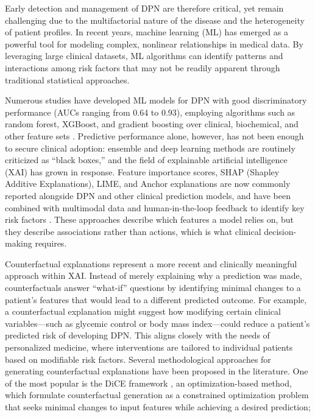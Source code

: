 \documentclass[pdflatex,sn-mathphys-num]{sn-jnl}%
\theoremstyle{thmstyleone}%
\theoremstyle{thmstyletwo}%
\theoremstyle{thmstylethree}%
\begin{document}
Early detection and management of DPN are therefore critical, yet remain challenging due to the multifactorial nature of the disease and the heterogeneity of patient profiles. In recent years, machine learning (ML) has emerged as a powerful tool for modeling complex, nonlinear relationships in medical data. By leveraging large clinical datasets, ML algorithms can identify patterns and interactions among risk factors that may not be readily apparent through traditional statistical approaches. 

Numerous studies have developed ML models for DPN with good discriminatory performance (AUCs ranging from 0.64 to 0.93), employing algorithms such as random forest, XGBoost, and gradient boosting over clinical, biochemical, and other feature sets \cite{ma2025machine,jiang2024multifeature,cui2023study,lian2023Study,Wei2024construction}. Predictive performance alone, however, has not been enough to secure clinical adoption: ensemble and deep learning methods are routinely criticized as ``black boxes,'' and the field of explainable artificial intelligence (XAI) has grown in response. Feature importance scores, SHAP (Shapley Additive Explanations), LIME, and Anchor explanations are now commonly reported alongside DPN and other clinical prediction models, and have been combined with multimodal data and human-in-the-loop feedback to identify key risk factors \cite{wu2025prognostic,jiang2024multifeature,pandey2024decoding,wu2024interpretable,sheikh2025predicting,nguyen2024interpretable,alHudaibi2025explainable,lalwani2025generative}. These approaches describe which features a model relies on, but they describe associations rather than actions, which is what clinical decision-making requires.

Counterfactual explanations represent a more recent and clinically meaningful approach within XAI. Instead of merely explaining why a prediction was made, counterfactuals answer ``what-if'' questions by identifying minimal changes to a patient's features that would lead to a different predicted outcome. For example, a counterfactual explanation might suggest how modifying certain clinical variables---such as glycemic control or body mass index---could reduce a patient's predicted risk of developing DPN. This aligns closely with the needs of personalized medicine, where interventions are tailored to individual patients based on modifiable risk factors. Several methodological approaches for generating counterfactual explanations have been proposed in the literature. One of the most popular is the DiCE framework \cite{mothilal2020explaining}, an optimization-based method, which formulate counterfactual generation as a constrained optimization problem that seeks minimal changes to input features while achieving a desired prediction;
\end{document}
